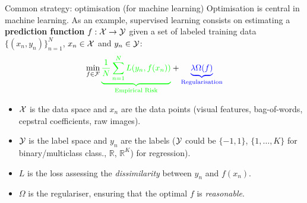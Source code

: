 \documentclass[aspectratio=169]{beamer}
\begin{document}
\begin{frame}{Common strategy: optimisation (for machine learning)}
Optimisation is central in machine learning. As an example, supervised learning consists on estimating a {\bf prediction function} $f:{\cal X}\rightarrow{\cal Y}$ given a set of labeled training data $\{(x_n,y_n)\}_{n=1}^N$, $x_n\in{\cal X}$ and $y_n\in{\cal Y}$:
$$\min_{f\in{\cal F}} {\color{green}\underbrace{\frac{1}{N}\sum_{n=1}^N L(y_n,f(x_n))}_{\text{Empirical Risk}}} + {\color{blue} \underbrace{\lambda \Omega(f)}_{\text{Regularisation}} } $$

\pause
\begin{itemize}
 \item ${\cal X}$ is the data space and $x_n$ are the data points (visual features, bag-of-words, cepstral coefficients, raw images).\pause
 \item ${\cal Y}$ is the label space and $y_n$ are the labels (${\cal Y}$ could be $\{-1,1\}$, $\{1,\ldots,K\}$ for binary/multiclass class., $\mathbb{R}$, $\mathbb{R}^K$) for regression).\pause
 \item {\color{green} $L$ is the loss assessing the \textit{dissimilarity} between $y_n$ and $f(x_n)$.}\pause
 \item {\color{blue} $\Omega$ is the regulariser, ensuring that the optimal $f$ is \textit{reasonable}.}
\end{itemize}
\end{frame}

%  
% 
\end{document}
